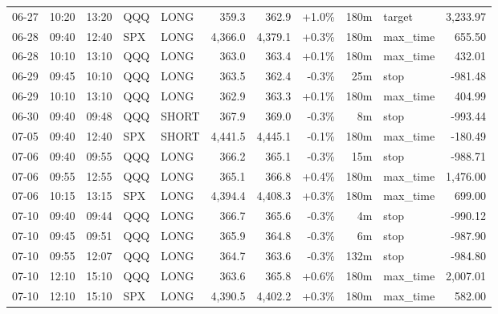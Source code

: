 \documentclass[11pt,a4paper,twoside]{article}
\begin{document}
\begin{center}
\begin{longtable}{>{\color{txtmain}}l l l l l r r r r >{\color{txtmain}}l r}
06-27 & 10:20 & 13:20 & QQQ & LONG & 359.3 & 362.9 & \textcolor{wingreen}{+1.0\%} & 180m & target & \textcolor{wingreen}{3,233.97} \\
06-28 & 09:40 & 12:40 & SPX & LONG & 4,366.0 & 4,379.1 & \textcolor{wingreen}{+0.3\%} & 180m & max\_time & \textcolor{wingreen}{655.50} \\
06-28 & 10:10 & 13:10 & QQQ & LONG & 363.0 & 363.4 & \textcolor{wingreen}{+0.1\%} & 180m & max\_time & \textcolor{wingreen}{432.01} \\
06-29 & 09:45 & 10:10 & QQQ & LONG & 363.5 & 362.4 & \textcolor{lossred}{-0.3\%} & 25m & stop & \textcolor{lossred}{-981.48} \\
06-29 & 10:10 & 13:10 & QQQ & LONG & 362.9 & 363.3 & \textcolor{wingreen}{+0.1\%} & 180m & max\_time & \textcolor{wingreen}{404.99} \\
06-30 & 09:40 & 09:48 & QQQ & SHORT & 367.9 & 369.0 & \textcolor{lossred}{-0.3\%} & 8m & stop & \textcolor{lossred}{-993.44} \\
07-05 & 09:40 & 12:40 & SPX & SHORT & 4,441.5 & 4,445.1 & \textcolor{lossred}{-0.1\%} & 180m & max\_time & \textcolor{lossred}{-180.49} \\
07-06 & 09:40 & 09:55 & QQQ & LONG & 366.2 & 365.1 & \textcolor{lossred}{-0.3\%} & 15m & stop & \textcolor{lossred}{-988.71} \\
07-06 & 09:55 & 12:55 & QQQ & LONG & 365.1 & 366.8 & \textcolor{wingreen}{+0.4\%} & 180m & max\_time & \textcolor{wingreen}{1,476.00} \\
07-06 & 10:15 & 13:15 & SPX & LONG & 4,394.4 & 4,408.3 & \textcolor{wingreen}{+0.3\%} & 180m & max\_time & \textcolor{wingreen}{699.00} \\
07-10 & 09:40 & 09:44 & QQQ & LONG & 366.7 & 365.6 & \textcolor{lossred}{-0.3\%} & 4m & stop & \textcolor{lossred}{-990.12} \\
07-10 & 09:45 & 09:51 & QQQ & LONG & 365.9 & 364.8 & \textcolor{lossred}{-0.3\%} & 6m & stop & \textcolor{lossred}{-987.90} \\
07-10 & 09:55 & 12:07 & QQQ & LONG & 364.7 & 363.6 & \textcolor{lossred}{-0.3\%} & 132m & stop & \textcolor{lossred}{-984.80} \\
07-10 & 12:10 & 15:10 & QQQ & LONG & 363.6 & 365.8 & \textcolor{wingreen}{+0.6\%} & 180m & max\_time & \textcolor{wingreen}{2,007.01} \\
07-10 & 12:10 & 15:10 & SPX & LONG & 4,390.5 & 4,402.2 & \textcolor{wingreen}{+0.3\%} & 180m & max\_time & \textcolor{wingreen}{582.00} \\

\end{longtable}
\end{center}
\end{document}
